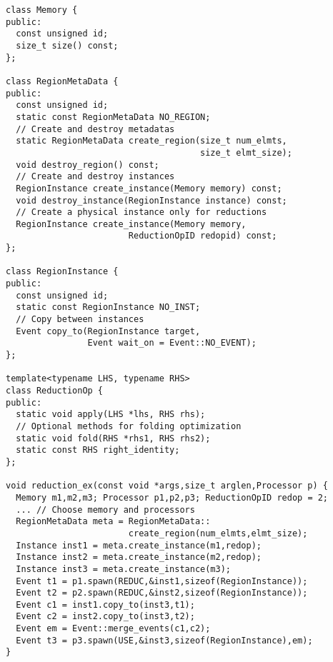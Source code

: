 \begin{lstlisting}[float={t},label={lst:regionapi},caption={Physical Region Interface and Example.}]
class Memory {
public:
  const unsigned id;
  size_t size() const;
};

class RegionMetaData {
public:
  const unsigned id;
  static const RegionMetaData NO_REGION;
  // Create and destroy metadatas
  static RegionMetaData create_region(size_t num_elmts, 
                                      size_t elmt_size);
  void destroy_region() const;
  // Create and destroy instances
  RegionInstance create_instance(Memory memory) const;
  void destroy_instance(RegionInstance instance) const;
  // Create a physical instance only for reductions
  RegionInstance create_instance(Memory memory, 
                        ReductionOpID redopid) const;
};

class RegionInstance {
public:
  const unsigned id;
  static const RegionInstance NO_INST;
  // Copy between instances
  Event copy_to(RegionInstance target, 
                Event wait_on = Event::NO_EVENT);
};

template<typename LHS, typename RHS>
class ReductionOp {
public:
  static void apply(LHS *lhs, RHS rhs);
  // Optional methods for folding optimization
  static void fold(RHS *rhs1, RHS rhs2);
  static const RHS right_identity;
};

void reduction_ex(const void *args,size_t arglen,Processor p) {
  Memory m1,m2,m3; Processor p1,p2,p3; ReductionOpID redop = 2;
  ... // Choose memory and processors
  RegionMetaData meta = RegionMetaData::
                        create_region(num_elmts,elmt_size);
  Instance inst1 = meta.create_instance(m1,redop);
  Instance inst2 = meta.create_instance(m2,redop);
  Instance inst3 = meta.create_instance(m3);
  Event t1 = p1.spawn(REDUC,&inst1,sizeof(RegionInstance));
  Event t2 = p2.spawn(REDUC,&inst2,sizeof(RegionInstance));
  Event c1 = inst1.copy_to(inst3,t1);
  Event c2 = inst2.copy_to(inst3,t2);
  Event em = Event::merge_events(c1,c2);
  Event t3 = p3.spawn(USE,&inst3,sizeof(RegionInstance),em);
}
\end{lstlisting}

